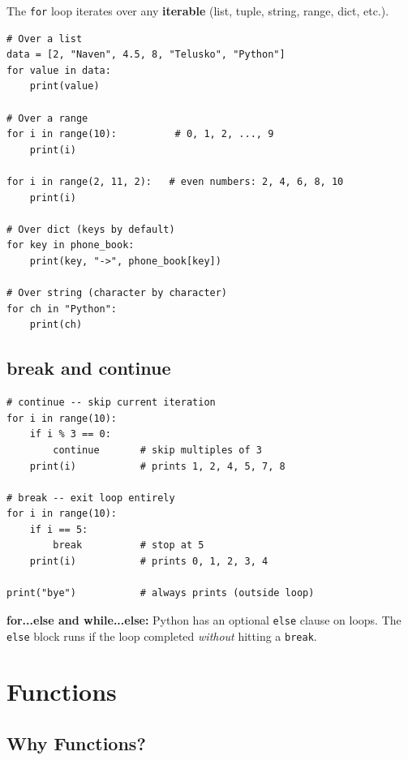 \documentclass[12pt,a4paper]{article}
\newcommand{\code}[1]{\texttt{\small\color{pyblue}#1}}
\begin{document}
The \code{for} loop iterates over any \textbf{iterable} (list, tuple, string, range, dict, etc.).

\begin{lstlisting}
# Over a list
data = [2, "Naven", 4.5, 8, "Telusko", "Python"]
for value in data:
    print(value)

# Over a range
for i in range(10):          # 0, 1, 2, ..., 9
    print(i)

for i in range(2, 11, 2):   # even numbers: 2, 4, 6, 8, 10
    print(i)

# Over dict (keys by default)
for key in phone_book:
    print(key, "->", phone_book[key])

# Over string (character by character)
for ch in "Python":
    print(ch)
\end{lstlisting}

\subsection{break and continue}

\begin{lstlisting}
# continue -- skip current iteration
for i in range(10):
    if i % 3 == 0:
        continue       # skip multiples of 3
    print(i)           # prints 1, 2, 4, 5, 7, 8

# break -- exit loop entirely
for i in range(10):
    if i == 5:
        break          # stop at 5
    print(i)           # prints 0, 1, 2, 3, 4

print("bye")           # always prints (outside loop)
\end{lstlisting}

\begin{tipbox}
\textbf{for...else and while...else:} Python has an optional \code{else} clause on loops. The \code{else} block runs if the loop completed \textit{without} hitting a \code{break}.
\end{tipbox}

\section{Functions}

\subsection{Why Functions?}
\end{document}
